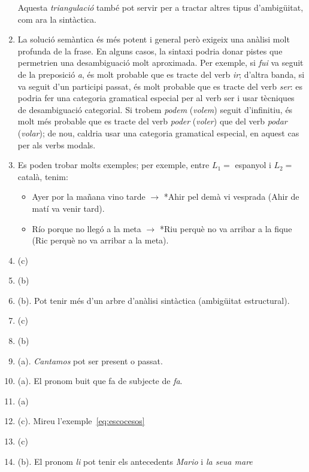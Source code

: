 \begin{enumerate}
      Aquesta \emph{triangulació} també pot servir per a tractar altres tipus
      d'ambigüitat, com ara la sintàctica.

      
    \item La solució semàntica és més potent i general però exigeix
      una anàlisi molt profunda de la frase. En alguns casos, la
      sintaxi podria donar pistes que permetrien una desambiguació
      molt aproximada. Per exemple, si {\em fui\/} va seguit de la
      preposició {\em a}, és molt probable que es tracte del verb {\em
        ir}; d'altra banda, si va seguit d'un participi passat, és
      molt probable que es tracte del verb {\em ser\/}: es podria fer
      una categoria gramatical especial per al verb ser i usar
      tècniques de desambiguació categorial. Si trobem {\em podem\/}
      ({\em volem\/}) seguit d'infinitiu, és molt més probable que es
      tracte del verb {\em poder\/} ({\em voler\/}) que del verb {\em
        podar} ({\em volar\/}); de nou, caldria usar una categoria
      gramatical especial, en aquest cas per als verbs modals.
     
    \item Es poden trobar molts exemples; per exemple, 
     entre $L_1 =$ espanyol i $L_2 =$ català, tenim:
    \begin{itemize}
    \item Ayer por la mañana vino tarde $\rightarrow$ *Ahir pel demà vi
      vesprada (Ahir de matí va venir tard).
    \item Río porque no llegó a la meta $\rightarrow$ *Riu perquè no
      va arribar a la fique (Ric perquè no va arribar a la meta).
    \end{itemize}
      
\item (c)
\item (b)
\item (b). Pot tenir més d'un arbre d'anàlisi sintàctica (ambigüitat
  estructural). 
\item (c)
\item (b)
\item (a). \emph{Cantamos} pot ser present o passat.
\item (a). El pronom buit que fa de subjecte de \emph{fa}.
\item (a)
\item (c). Mireu l'exemple~\ref{eq:escocesos}
\item (c)
\item (b). El pronom \emph{li} pot tenir els antecedents \emph{Mario}
  i \emph{la seua mare}


\end{enumerate}

